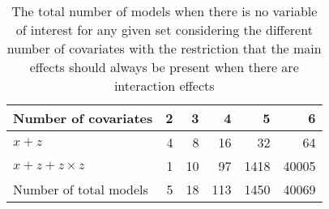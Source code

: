 \begin{table}[!h]
\centering
\caption{The total number of models when there is no variable of interest for any given set considering the different number of covariates with the restriction that the main effects should always be present when there are interaction effects} 
\begin{tabular}{lrrrrr}
  \hline
Number of covariates & 2 & 3 & 4 & 5 & 6 \\ 
  \hline
  $x + z$ & 4 & 8 & 16 & 32 & 64 \\ 
  $x + z + z \times z$ & 1 & 10 & 97 & 1418 & 40005 \\ 
  \hline
  Number of total models & 5 & 18 & 113 & 1450 & 40069 \\ 
   \hline
\end{tabular}
\end{table}
